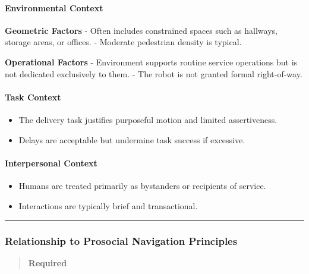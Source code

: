 \documentclass[utf8]{frontiers_suppmat} %
\providecommand{\tightlist}{%
  \setlength{\itemsep}{0pt}\setlength{\parskip}{0pt}}
\begin{document}
\paragraph{Environmental Context}\label{environmental-context}

\textbf{Geometric Factors} - Often includes constrained spaces such as
hallways, storage areas, or offices. - Moderate pedestrian density is
typical.

\textbf{Operational Factors} - Environment supports routine service
operations but is not dedicated exclusively to them. - The robot is not
granted formal right-of-way.

\paragraph{Task Context}\label{task-context}

\begin{itemize}
\tightlist
\item
  The delivery task justifies purposeful motion and limited
  assertiveness.
\item
  Delays are acceptable but undermine task success if excessive.
\end{itemize}

\paragraph{Interpersonal Context}\label{interpersonal-context}

\begin{itemize}
\tightlist
\item
  Humans are treated primarily as bystanders or recipients of service.
\item
  Interactions are typically brief and transactional.
\end{itemize}

\begin{center}\rule{0.5\linewidth}{0.5pt}\end{center}

\subsubsection{Relationship to Prosocial Navigation
Principles}\label{relationship-to-prosocial-navigation-principles}

\begin{quote}
\textbf{Required}
\end{quote}
\end{document}
